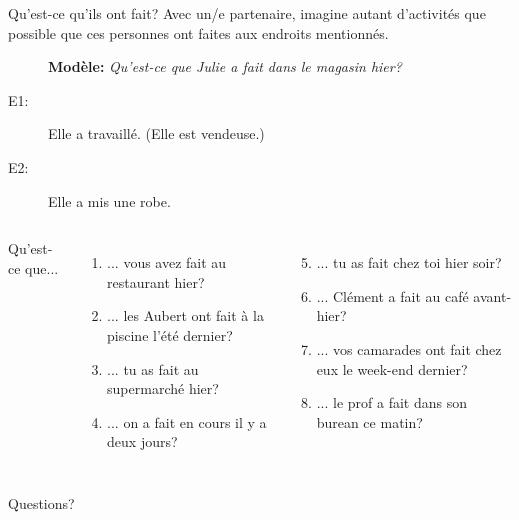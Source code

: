 \documentclass{beamer}
\begin{document}
  \begin{frame}{Qu'est-ce qu'ils ont fait?}
    Avec un/e partenaire, imagine autant d'activités que possible que ces personnes ont faites aux endroits mentionnés. \\
    \begin{description}
      \item[] \textbf{Modèle:} \emph{Qu'est-ce que Julie a fait dans le magasin hier?}
      \item[E1:] Elle a travaillé. (Elle est vendeuse.)
      \item[E2:] Elle a mis une robe.
    \end{description}
    \begin{columns}[t]
        Qu'est-ce que...
        \begin{enumerate}
          \item ... vous avez fait au restaurant hier?
          \item ... les Aubert ont fait à la piscine l'été dernier?
          \item ... tu as fait au supermarché hier?
          \item ... on a fait en cours il y a deux jours?
        \end{enumerate}
        \begin{enumerate}
          \setcounter{enumi}{4}
          \item ... tu as fait chez toi hier soir?
          \item ... Clément a fait au café avant-hier?
          \item ... vos camarades ont fait chez eux le week-end dernier?
          \item ... le prof a fait dans son burean ce matin?
        \end{enumerate}
    \end{columns}
  \end{frame}

  \begin{frame}{}
    \begin{center}
      \Large Questions?
    \end{center}
  \end{frame}
\end{document}
